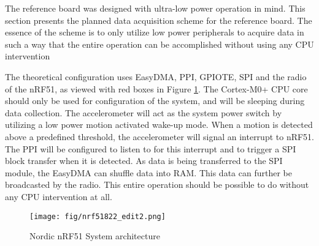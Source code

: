 The reference board was designed with ultra-low power operation in mind. This section presents the planned data acquisition scheme for the reference board. The essence of the scheme is to only utilize low power peripherals to acquire data in such a way that the entire operation can be accomplished without using any CPU intervention  

The theoretical configuration uses EasyDMA, PPI, GPIOTE, SPI and the radio of the nRF51, as viewed with red boxes in Figure \ref{fig:nrf51}. The Cortex-M0+ CPU core should only be used for configuration of the system, and will be sleeping during data collection. The accelerometer will act as the system power switch by utilizing a low power motion activated wake-up mode. When a motion is detected above a predefined threshold, the accelerometer will signal an interrupt to nRF51. The PPI will be configured to listen to for this interrupt and to trigger a SPI block transfer when it is detected. As data is being transferred to the SPI module, the EasyDMA can shuffle data into RAM. This data can further be broadcasted by the radio. This entire operation should be possible to do without any CPU intervention at all.

\begin{figure}[h]
\centering
\texttt{[image: fig/nrf51822\_edit2.png]}
\caption{Nordic nRF51 System architecture \cite{nrf51}}
\label{fig:nrf51}
\end{figure}